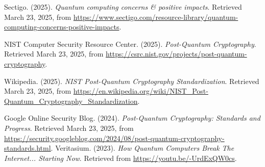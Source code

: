 \documentclass[12pt,a4paper]{report}
\begin{document}
\begin{thebibliography}{50}
    Sectigo. (2025).
    \textit{Quantum computing concerns \& positive impacts}.
    Retrieved March 23, 2025, from \url{https://www.sectigo.com/resource-library/quantum-computing-concerns-positive-impacts}.
    
    NIST Computer Security Resource Center. (2025).
    \textit{Post-Quantum Cryptography}.
    Retrieved March 23, 2025, from \url{https://csrc.nist.gov/projects/post-quantum-cryptography}.
    
    Wikipedia. (2025).
    \textit{NIST Post-Quantum Cryptography Standardization}.
    Retrieved March 23, 2025, from \url{https://en.wikipedia.org/wiki/NIST_Post-Quantum_Cryptography_Standardization}.
    
    Google Online Security Blog. (2024).
    \textit{Post-Quantum Cryptography: Standards and Progress}.
    Retrieved March 23, 2025, from \url{https://security.googleblog.com/2024/08/post-quantum-cryptography-standards.html}.
    Veritasium. (2023). \textit{How Quantum Computers Break The Internet... Starting Now}. Retrieved from \url{https://youtu.be/-UrdExQW0cs}.
\end{thebibliography}
\end{document}
